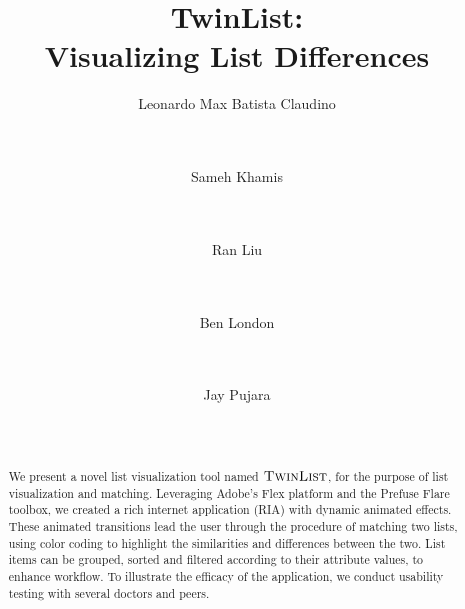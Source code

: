 \documentclass{chi2009}
\newcommand{\TwinList}{\textsc{TwinList}}
\begin{document}
\setlength{\paperheight}{11in}
\setlength{\paperwidth}{8.5in}
\setlength{\pdfpageheight}{\paperheight}
\setlength{\pdfpagewidth}{\paperwidth}


\title{TwinList: \\ Visualizing List Differences}
\author{
  \alignauthor Leonardo Max Batista Claudino \\
    \\
    \\
  \and
  \alignauthor Sameh Khamis\\
    \\
    \\
  \and
  \alignauthor Ran Liu \\
    \\
    \\
  \and
  \alignauthor Ben London \\
    \\
    \\
  \and
  \alignauthor Jay Pujara \\
    \\
    \\
}

\maketitle

\begin{abstract}
We present a novel list visualization tool named $\TwinList$, for the purpose of list visualization and matching. Leveraging Adobe's Flex platform and the Prefuse Flare toolbox, we created a rich internet application (RIA) with dynamic animated effects. These animated transitions lead the user through the procedure of matching two lists, using color coding to highlight the similarities and differences between the two. List items can be grouped, sorted and filtered according to their attribute values, to enhance workflow. To illustrate the efficacy of the application, we conduct usability testing with several doctors and peers.
\end{abstract}
\end{document}
